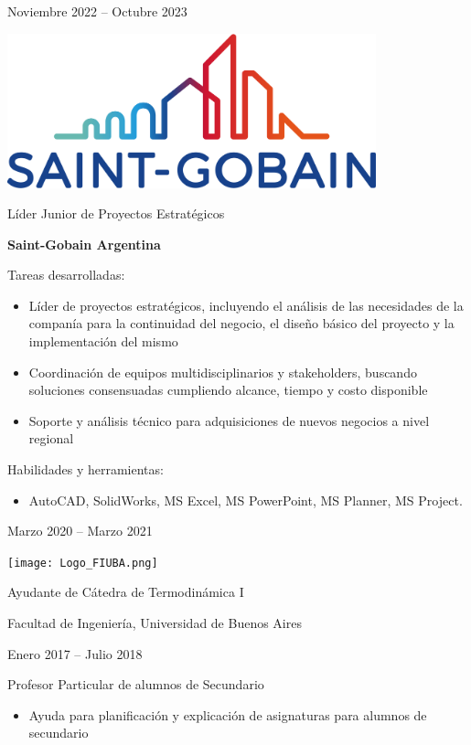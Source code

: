 \documentclass[a4paper,10pt]{article}
\newlength{\cvcolumngapwidth}
\newlength{\cvleftcolumnwidth}
\newlength{\cvrightcolumnwidth}
\newcommand{\cvtitlestyle}[1]{{\large\cvtitlefont\textcolor{cvtitlecolor}{#1}}}
\newcommand{\cvdurationstyle}[1]{{\small\cvdurationfont\textcolor{cvdurationcolor}{#1}}}
\newlength{\cvafteritemskipamount}
\newlength{\cvaftertitleskipamount}
\newlength{\cvparskip}
\newcommand{\cvitem}[2]{
    \begin{minipage}[t]{\cvleftcolumnwidth}
        \raggedleft #1
    \end{minipage}%
    \hspace{\cvcolumngapwidth}%
    \begin{minipage}[t]{\cvrightcolumnwidth}
        \setlength{\parskip}{\cvparskip} #2
    \end{minipage}

    \vspace{\cvafteritemskipamount}
}
\newcommand{\cvtitle}[1]{
    \cvtitlestyle{#1}

    \vspace{\cvaftertitleskipamount}
    \vspace{-\cvparskip}
}
\begin{document}
\cvitem{
    \cvdurationstyle{Noviembre 2022 -- Octubre 2023}
}{
    \begin{minipage}{0.1\textwidth}
        \centering
        \includegraphics[width=0.8\textwidth]{Logo_SG.png}   
    \end{minipage}
    \cvtitle{Líder Junior de Proyectos Estratégicos}

    \textbf{Saint-Gobain Argentina}
	
	Tareas desarrolladas:
    \begin{itemize}
        \item Líder de proyectos estratégicos, incluyendo el análisis de las necesidades de la companía para la continuidad del negocio, el diseño básico del proyecto y la implementación del mismo
        \item Coordinación de equipos multidisciplinarios y stakeholders, buscando soluciones consensuadas cumpliendo alcance, tiempo y costo disponible
        \item Soporte y análisis técnico para adquisiciones de nuevos negocios a nivel regional
    \end{itemize}
	
	Habilidades y herramientas:
	\begin{itemize}
		\item AutoCAD, SolidWorks, MS Excel, MS PowerPoint, MS Planner, MS Project.
	\end{itemize}

}

\cvitem{
    \cvdurationstyle{Marzo 2020 -- Marzo 2021}
}{
    \begin{minipage}{0.1\textwidth}
        \centering
        \texttt{[image: Logo\_FIUBA.png]}   
    \end{minipage}
    \cvtitle{Ayudante de Cátedra de Termodinámica I}

    Facultad de Ingeniería, Universidad de Buenos Aires
}

\cvitem{
    \cvdurationstyle{Enero 2017 -- Julio 2018}
}{
    \cvtitle{Profesor Particular de alumnos de Secundario}

    \begin{itemize}[leftmargin=*]
        \item Ayuda para planificación y explicación de asignaturas para alumnos de secundario
    \end{itemize}
}
\end{document}
